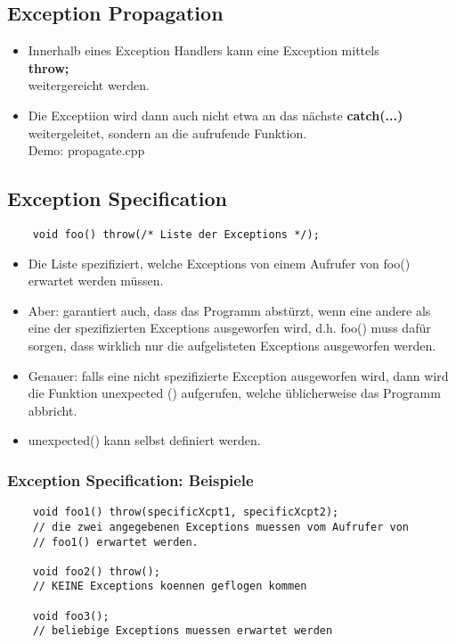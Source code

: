 \subsection{Exception Propagation}
\label{sec:Exception Propagation}
\begin{itemize}
	\item Innerhalb eines Exception Handlers kann eine Exception mittels\\
	\textbf{throw;}\\
	weitergereicht werden.
	\item Die Exceptiion wird dann auch nicht etwa an das nächste \textbf{catch(...)} weitergeleitet, sondern an die aufrufende Funktion.\\
	Demo: propagate.cpp
\end{itemize}

\subsection{Exception Specification}
\label{sec:Exception Specification}
\noindent
\begin{minipage}{\linewidth}
	\begin{lstlisting}
	void foo() throw(/* Liste der Exceptions */);
	\end{lstlisting}
\end{minipage}
\begin{itemize}
	\item Die Liste spezifiziert, welche Exceptions von einem Aufrufer von foo() erwartet werden müssen.
	\item Aber: garantiert auch, dass das Programm abstürzt, wenn eine andere als eine der spezifizierten Exceptions ausgeworfen wird, d.h. foo() muss dafür sorgen, dass wirklich nur die aufgelisteten Exceptions ausgeworfen werden.
	\item Genauer: falls eine nicht spezifizierte Exception ausgeworfen wird, dann wird die Funktion unexpected () aufgerufen, welche üblicherweise das Programm abbricht.
	\item unexpected() kann selbst definiert werden.
\end{itemize}

\subsubsection{Exception Specification: Beispiele}
\label{sec:Exception Specification: Beispiele}
\noindent
\begin{minipage}{\linewidth}
	\begin{lstlisting}
	void foo1() throw(specificXcpt1, specificXcpt2);
	// die zwei angegebenen Exceptions muessen vom Aufrufer von
	// foo1() erwartet werden.
	
	void foo2() throw();
	// KEINE Exceptions koennen geflogen kommen
	
	void foo3();
	// beliebige Exceptions muessen erwartet werden
	\end{lstlisting}
\end{minipage}


